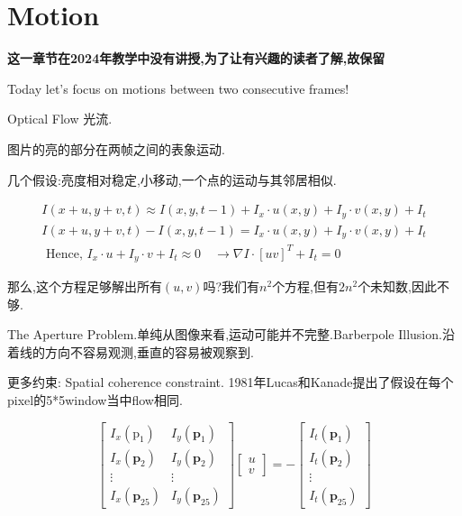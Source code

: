 \chapter{Motion}

\textbf{这一章节在2024年教学中没有讲授,为了让有兴趣的读者了解,故保留}

	Today let’s focus on motions between two consecutive frames!
	
	Optical Flow 光流.
	
	图片的亮的部分在两帧之间的表象运动.
	
	几个假设:亮度相对稳定,小移动,一个点的运动与其邻居相似.
	
	\begin{equation}
		\begin{array}{l}
			I(x+u, y+v, t) \approx I(x, y, t-1)+I_{x} \cdot u(x, y)+I_{y} \cdot v(x, y)+I_{t} \\
			I(x+u, y+v, t)-I(x, y, t-1)=I_{x} \cdot u(x, y)+I_{y} \cdot v(x, y)+I_{t} \\
			\text { Hence, } I_{x} \cdot u+I_{y} \cdot v+I_{t} \approx 0 \quad \rightarrow \nabla I \cdot[u v]^{T}+I_{t}=0
		\end{array}
	\end{equation}

	那么,这个方程足够解出所有$(u, v)$吗?我们有$n^2$个方程,但有$2n^2$个未知数,因此不够.
	
	The Aperture Problem.单纯从图像来看,运动可能并不完整.Barberpole Illusion.沿着线的方向不容易观测,垂直的容易被观察到.
	
	更多约束: Spatial coherence constraint. 1981年Lucas和Kanade提出了假设在每个pixel的5*5window当中flow相同.
	
	\begin{equation}
		\left[\begin{array}{cc}
			I_{x}\left(\mathrm{p}_{1}\right) & I_{y}\left(\mathbf{p}_{1}\right) \\
			I_{x}\left(\mathbf{p}_{2}\right) & I_{y}\left(\mathbf{p}_{2}\right) \\
			\vdots & \vdots \\
			I_{x}\left(\mathbf{p}_{25}\right) & I_{y}\left(\mathbf{p}_{25}\right)
		\end{array}\right]\left[\begin{array}{l}
			u \\
			v
		\end{array}\right]=-\left[\begin{array}{c}
			I_{t}\left(\mathbf{p}_{1}\right) \\
			I_{t}\left(\mathbf{p}_{2}\right) \\
			\vdots \\
			I_{t}\left(\mathbf{p}_{25}\right)
		\end{array}\right]
	\end{equation}

